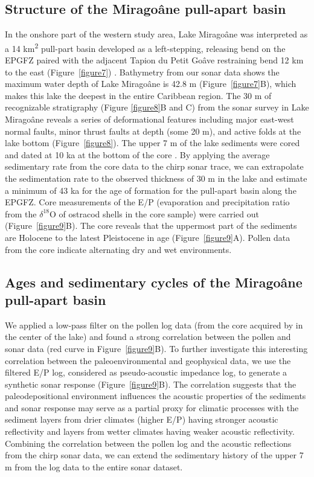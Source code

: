 \documentclass[linenumbers,draft]{agujournal}
\begin{document}
\subsection{Structure of the Mirago\^ane pull-apart basin}
In the onshore part of the western study area, Lake Mirago\^ane was interpreted as a 14 km\textsuperscript{2} pull-part basin developed as a left-stepping, releasing bend on the EPGFZ paired with the adjacent Tapion du Petit Go\^ave restraining bend 12 km to the east (Figure~\ref{figure7}) \citep{mann1995actively,cowgill2012interactive}. Bathymetry from our sonar data shows the maximum water depth of Lake Mirago\^ane is 42.8 m (Figure~\ref{figure7}B), which makes this lake the deepest \citep{higuera199910} in the entire Caribbean region. The 30 m of recognizable stratigraphy (Figure \ref{figure8}B and C) from the sonar survey in Lake Mirago\^ane reveals a series of deformational features including major east-west normal faults, minor thrust faults at depth (some 20 m), and active folds at the lake bottom (Figure~\ref{figure8}). The upper 7 m of the lake sediments were cored and dated at 10 ka at the bottom of the core \citep{higuera199910}. By applying the average sedimentary rate from the core data to the chirp sonar trace, we can extrapolate the sedimentation rate to the observed thickness of 30 m in the lake and estimate a minimum of 43 ka for the age of formation for the pull-apart basin along the EPGFZ. Core measurements of the E/P (evaporation and precipitation ratio from the $\delta^{18}$O of ostracod shells in the core sample) were carried out \citep{higuera199910} (Figure~\ref{figure9}B). The core reveals that the uppermost part of the sediments are Holocene to the latest Pleistocene in age (Figure~\ref{figure9}A). Pollen data from the core indicate alternating dry and wet environments.

\subsection{Ages and sedimentary cycles of the Mirago\^ane pull-apart basin}
We applied a low-pass filter on the pollen log data (from the core acquired by \citet{higuera199910} in the center of the lake) and found a strong correlation between the pollen and sonar data (red curve in Figure~\ref{figure9}B). To further investigate this interesting correlation between the paleoenvironmental and geophysical data, we use the filtered E/P log, considered as pseudo-acoustic impedance log, to generate a synthetic sonar response (Figure~\ref{figure9}B). The correlation suggests that the paleodepositional environment influences the acoustic properties of the sediments and sonar response may serve as a partial proxy for climatic processes with the sediment layers from drier climates (higher E/P) having stronger acoustic reflectivity and layers from wetter climates having weaker acoustic reflectivity. Combining the correlation between the pollen log and the acoustic reflections from the chirp sonar data, we can extend the sedimentary history of the upper 7 m from the log data to the entire sonar dataset. 
\end{document}
